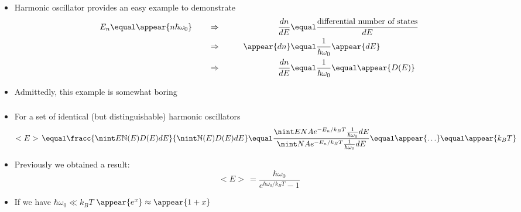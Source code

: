 \begin{frame}
\frametitle{\texorpdfstring{\culine[\sectiontitleulinecolor]{\sectiontitle}}{\sectiontitle} }

\begin{itemize}
\item Harmonic oscillator provides an easy example to demonstrate  
\[
\begin{aligned}
E_{n}  \equal \appear{n \hbar \omega_{0}} \qquad &\Rightarrow& \qquad
\frac{d n}{d E} &\equal \frac{\text{differential number of states}}{d E} \\
&\Rightarrow& \qquad \appear{d n} &  \equal \frac{1}{\hbar \omega_{0}} \appear{d E} \\
&\Rightarrow &    \frac{d n}{d E} & \equal \frac{1}{\hbar \omega_{0}}  \equal \appear{D(E)}
 \end{aligned}
\]

\item Admittedly, this example is somewhat boring 
\end{itemize}


\endofslide 
\end{frame}

\begin{frame}
\frametitle{\texorpdfstring{\culine[\sectiontitleulinecolor]{\sectiontitle}}{\sectiontitle} }

\begin{itemize}
	\item For a set of identical (but distinguishable) harmonic oscillators
\[ 
  < E >\,  \equal \fracc{\nint E \mathbb{N}(E) D(E) d E}{\nint \mathbb{N}(E) D(E) d E}  \equal \frac{\nint E N A e^{-E_{n} / k_{B} T} \frac{1}{\hbar \omega_{0}} d E}{\nint N A e^{-E_{n} / k_{B} T} \frac{1}{\hbar \omega_{0}} d E}  \equal \appear{\ldots} \equal \appear{k_{B} T} 
 \]
\item Previously we obtained a result:
\[ 
  < E >\,  \equal \frac{\hbar \omega_{0}}{e^{\hbar \omega_{0} / k_{B} T}-1} 
 \]
\item If we have $\hbar \omega_{0} \ll k_{B} T$ $\appear{e^{x}} \approx \appear{1+x}$
\end{itemize}

\endofsection
\end{frame}

